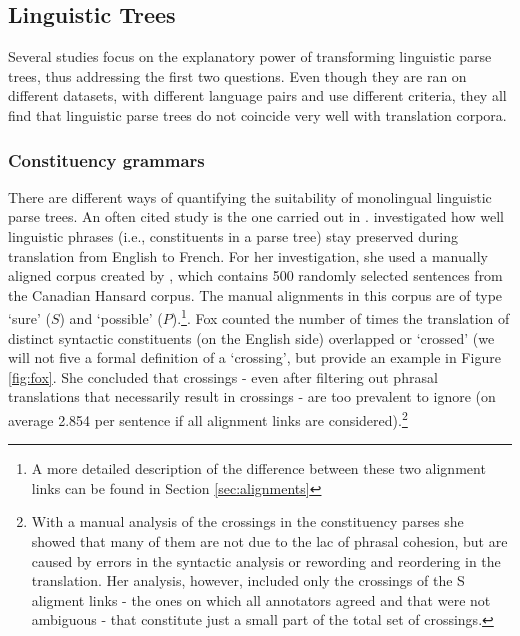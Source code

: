 \documentclass{report}
\theoremstyle{definition}
\theoremstyle{plain}
\begin{document}
\subsection{Linguistic Trees}

Several studies focus on the explanatory power of transforming linguistic parse trees, thus addressing the first two questions. Even though they are ran on different datasets, with different language pairs and use different criteria, they all find that linguistic parse trees do not coincide very well with translation corpora.

\subsubsection{Constituency grammars}

There are different ways of quantifying the suitability of monolingual linguistic parse trees. An often cited study is the one carried out in \cite{fox2002phrasal}. \citeauthor{fox2002phrasal} investigated how well linguistic phrases (i.e., constituents in a parse tree) stay preserved during translation from English to French. For her investigation, she used a manually aligned corpus created by \cite{och2000improved}, which contains 500 randomly selected sentences from the Canadian Hansard corpus. The manual alignments in this corpus are of type `sure' ($S$) and `possible' ($P$).\footnote{A more detailed description of the difference between these two alignment links can be found in Section \ref{sec:alignments}}. Fox counted the number of times the translation of distinct syntactic constituents (on the English side) overlapped or `crossed' (we will not five a formal definition of a `crossing', but provide an example in Figure \ref{fig:fox}. She concluded that crossings - even after filtering out phrasal translations that necessarily result in crossings - are too prevalent to ignore (on average 2.854 per sentence if all alignment links are considered).\footnote{With a manual analysis of the crossings in the constituency parses she showed that many of them are not due to the lac of phrasal cohesion, but are caused by errors in the syntactic analysis or rewording and reordering in the translation. Her analysis, however, included only the crossings of the S aligment links - the ones on which all annotators agreed and that were not ambiguous - that constitute just a small part of the total set of crossings.}
\end{document}
